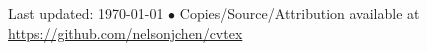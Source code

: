 \documentclass[10pt, letter]{article}
\begin{document}
\begin{center}
{\scriptsize  Last updated: \today\- $\bullet$\-
Copies/Source/Attribution available at \href{https://github.com/nelsonjchen/cvtex}{https://github.com/nelsonjchen/cvtex}}
\end{center}
\end{document}
